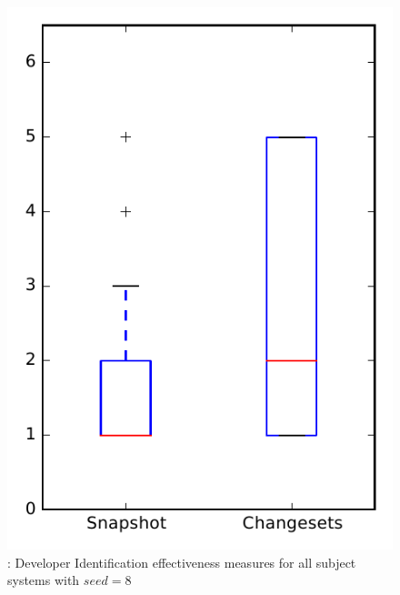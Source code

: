 
\begin{figure}
\centering
\includegraphics[height=0.4\textheight]{figures/dit_seed/rq1_overview_8}
\caption{\rtwo: Developer Identification effectiveness measures for all subject systems with $seed=8$}
\label{fig:dit_seed:rq1:overview}
\end{figure}
